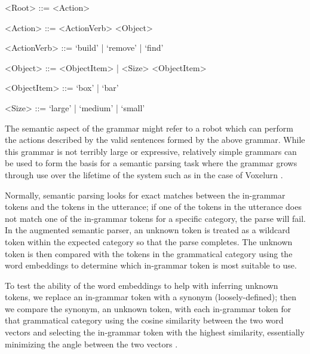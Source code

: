 \documentclass[a4paper]{article}
\begin{document}
\vspace{5mm}
\begin{addmargin}[1cm]{0cm}
    \begin{grammar}

    <Root> ::= <Action>

    <Action> ::= <ActionVerb> <Object>
    
    <ActionVerb> ::= `build' | `remove' | `find'

    <Object> ::= <ObjectItem> | <Size> <ObjectItem>

    <ObjectItem> ::= `box' | `bar'
    
    <Size> ::= `large' | `medium' | `small'
    
    \end{grammar}
\end{addmargin}
\vspace{5mm}

The semantic aspect of the grammar might refer to a robot which can
perform the actions described by the valid sentences formed by the
above grammar. 
While this grammar is not terribly large or expressive, relatively simple
grammars can be used to form the basis for a semantic parsing task where
the grammar grows through use over the lifetime of the system such as in
the case of Voxelurn
\cite{DBLP:journals/corr/WangGLM17}.

Normally, semantic parsing looks for exact matches between the in-grammar
tokens and the tokens in the utterance; if one of the
tokens in the utterance does not match one of the in-grammar tokens for a
specific category, the parse will fail.
In the augmented semantic parser, an unknown token is treated as a wildcard
token within the expected category
so that the parse completes. The unknown token is then compared with the
tokens in the grammatical category using the word embeddings to determine
which in-grammar token is most suitable to use.

To test the ability of the word embeddings to help with inferring unknown
tokens, we replace an in-grammar token with a synonym (loosely-defined);
then we compare the synonym, an unknown token, with each in-grammar token
for that grammatical category using the cosine similarity between the
two word vectors and selecting the in-grammar token with the highest similarity,
essentially minimizing the angle between the two vectors
\cite{manning-synonyms}.

\end{document}
